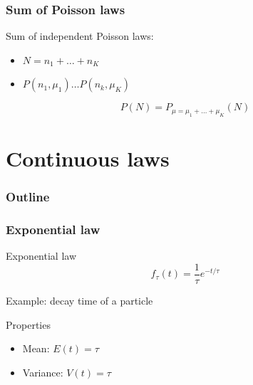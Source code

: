 \documentclass[9pt]{beamer}
\newif\ifmynote
\newcommand\mynote[1]{%
\ifmynote \textbf{#1} \else \fi
}
\begin{document}
\begin{frame}
 \frametitle{Sum of Poisson laws}
 
 \mynote{Écrire au tableau}
 
 Sum of independent Poisson laws:
 
 \begin{itemize}
  \item $N = n_1 + \dots + n_K$
  \item $P(n_1,\mu_1) \dots P(n_k,\mu_K)$
 \end{itemize}
 
 $$P(N) = P_{\mu = \mu_1 + \dots + \mu_K}(N)$$
 

\end{frame}

\section{Continuous laws}

\begin{frame}
 \frametitle{Outline}
 
 \tableofcontents[current]
\end{frame}

\begin{frame}
 \frametitle{Exponential law}
 
 \mynote{Écrire au tableau}
 
 \begin{block}{Exponential law}
  $$f_\tau (t) = \frac{1}{\tau} e^{-t/\tau}$$
 \end{block}
 
 Example: decay time of a particle
 
 \begin{block}{Properties}
  \begin{itemize}
   \item Mean: $E(t) = \tau$
   \item Variance: $V(t) = \tau$
  \end{itemize}

 \end{block}


\end{frame}
\end{document}

